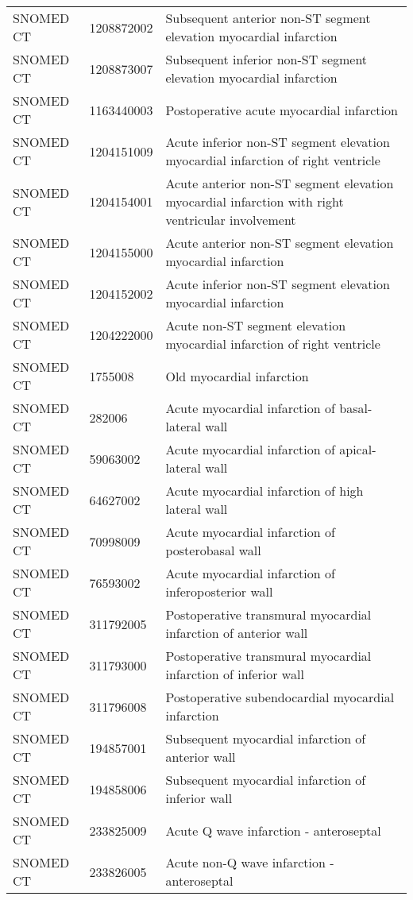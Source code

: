 \begin{longtable}{p{}p{}p{}}
  SNOMED CT & 1208872002 & Subsequent anterior non-ST segment elevation myocardial infarction \\ 
  SNOMED CT & 1208873007 & Subsequent inferior non-ST segment elevation myocardial infarction \\ 
  SNOMED CT & 1163440003 & Postoperative acute myocardial infarction \\ 
  SNOMED CT & 1204151009 & Acute inferior non-ST segment elevation myocardial infarction of right ventricle \\ 
  SNOMED CT & 1204154001 & Acute anterior non-ST segment elevation myocardial infarction with right ventricular involvement \\ 
  SNOMED CT & 1204155000 & Acute anterior non-ST segment elevation myocardial infarction \\ 
  SNOMED CT & 1204152002 & Acute inferior non-ST segment elevation myocardial infarction \\ 
  SNOMED CT & 1204222000 & Acute non-ST segment elevation myocardial infarction of right ventricle \\ 
  SNOMED CT & 1755008 & Old myocardial infarction \\ 
  SNOMED CT & 282006 & Acute myocardial infarction of basal-lateral wall \\ 
  SNOMED CT & 59063002 & Acute myocardial infarction of apical-lateral wall \\ 
  SNOMED CT & 64627002 & Acute myocardial infarction of high lateral wall \\ 
  SNOMED CT & 70998009 & Acute myocardial infarction of posterobasal wall \\ 
  SNOMED CT & 76593002 & Acute myocardial infarction of inferoposterior wall \\ 
  SNOMED CT & 311792005 & Postoperative transmural myocardial infarction of anterior wall \\ 
  SNOMED CT & 311793000 & Postoperative transmural myocardial infarction of inferior wall \\ 
  SNOMED CT & 311796008 & Postoperative subendocardial myocardial infarction \\ 
  SNOMED CT & 194857001 & Subsequent myocardial infarction of anterior wall \\ 
  SNOMED CT & 194858006 & Subsequent myocardial infarction of inferior wall \\ 
  SNOMED CT & 233825009 & Acute Q wave infarction - anteroseptal \\ 
  SNOMED CT & 233826005 & Acute non-Q wave infarction - anteroseptal \\ 

\end{longtable}
